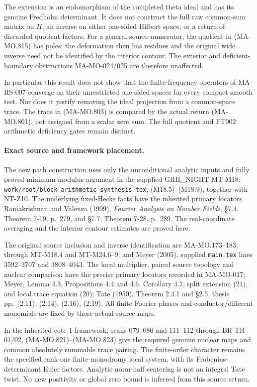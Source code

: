 The extension is an endomorphism of the completed
theta ideal and has its genuine Fredholm determinant.
It does not construct the full raw common-sum matrix
on \(H\), an inverse on either one-sided Hilbert space,
or a return of discarded quotient factors.
For a general source numerator, the quotient in
(MA-MO.815) has poles; the deformation then has
residues and the original wide inverse need not
be identified by the interior contour. The exterior
and deficient-boundary obstructions MA-MO-024/025
are therefore unaffected.

In particular this result does not show that the
finite-frequency operators of MA-RS-007 converge
on their unrestricted one-sided spaces for every
compact smooth test. Nor does it justify removing
the ideal projection from a common-space trace.
The trace in (MA-MO.803) is compared by the actual
return (MA-MO.801), not assigned from a scalar
zero sum. The full quotient and FT002 arithmetic
deficiency gates remain distinct.

\paragraph{Exact source and framework placement.}
The new path construction uses only the unconditional
analytic inputs and fully proved minimum-modulus
argument in the supplied GRH\_NIGHT MT-M18:
\texttt{work/root/block\_arithmetic\_synthesis.tex},
(M18.5)--(M18.9), together with NT-Z10.
The underlying fixed-Hecke facts have the inherited
primary locators Ramakrishnan and Valenza (1999),
\emph{Fourier Analysis on Number Fields}, \S7.4,
Theorem 7-19, p.~279, and \S7.7, Theorem 7-28,
p.~289. The real-coordinate averaging and the
interior contour estimates are proved here.

The original source inclusion and inverse identification
are MA-MO.173--183, through MT-M18.4 and MT-M24.6--9,
and Meyer (2005), supplied \texttt{main.tex}
lines 3592--3707 and 3808--4043.
The local multiplier, paired source topology and
nuclear comparison have the precise primary
locators recorded in MA-MO-017: Meyer, Lemma 4.3,
Propositions 4.4 and 4.6, Corollary 4.7, split
extension (24), and local trace equation (20);
Tate (1950), Theorem 2.4.1 and \S2.5, thesis
pp.~(2.11), (2.14), (2.16), (2.19).
All finite Fourier phases and conductor/different
monomials are fixed by those actual source maps.

In the inherited cote 1 framework, scans 079--080
and 111--112 through BR-TR-01/02, (MA-MO.821)--(MA-MO.823)
give the required genuine nuclear maps and common
absolutely summable trace pairing. The finite-order
character remains the specified rank-one finite-monodromy
local system, with its Frobenius-determinant Euler
factors. Analytic norm-half centering is not an
integral Tate twist. No new positivity or global
zero bound is inferred from this source return.
